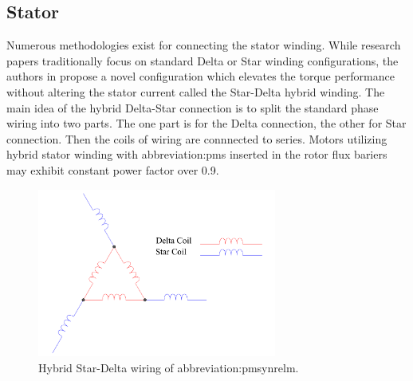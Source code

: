 \documentclass[a4paper, twoside, 11pt]{article}
\begin{document}
    \subsection{Stator}
        Numerous methodologies exist for connecting the stator winding. While research papers traditionally focus on standard Delta or Star winding configurations, the authors in \cite{ibrahim-an-improved-torque-density-synchronous-reluctance-machine-with-a-combined-star-delta-winding-layout, ibrahim-permanent-magnet-assisted-synchronous-reluctance-motor-employing-a-hybrid-star-delta-winding-for-high-speed-applicaitons} propose a novel configuration which elevates the torque performance without altering the stator current called the Star-Delta hybrid winding. The main idea of the hybrid Delta-Star connection is to split the standard phase wiring into two parts. The one part is for the Delta connection, the other for Star connection. Then the coils of wiring are connnected to series. Motors utilizing hybrid stator winding with \gls{abbreviation:pm}s inserted in the rotor flux bariers may exhibit constant power factor over 0.9. \cite{ibrahim-permanent-magnet-assisted-synchronous-reluctance-motor-employing-a-hybrid-star-delta-winding-for-high-speed-applicaitons}

        \begin{figure}[htbp!]
            \centering
            \includegraphics[width=0.7\textwidth]{src/pdf/hybrid-star-delta-wiring.pdf}
            \caption{Hybrid Star-Delta wiring of \gls{abbreviation:pmsynrelm}.}
            \label{fig:hybrid-star-delta-wiring}
        \end{figure}
\end{document}
